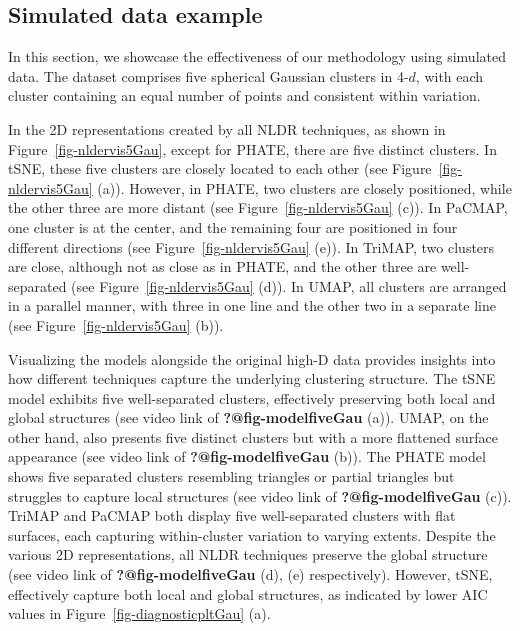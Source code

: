 \documentclass[
  12pt]{article}
\begin{document}
\hypertarget{sec-simpleex}{%
\subsection{Simulated data example}\label{sec-simpleex}}

In this section, we showcase the effectiveness of our methodology using
simulated data. The dataset comprises five spherical Gaussian clusters
in 4-\(d\), with each cluster containing an equal number of points and
consistent within variation.

In the 2D representations created by all NLDR techniques, as shown in
Figure~\ref{fig-nldervis5Gau}, except for PHATE, there are five distinct
clusters. In tSNE, these five clusters are closely located to each other
(see Figure~\ref{fig-nldervis5Gau} (a)). However, in PHATE, two clusters
are closely positioned, while the other three are more distant (see
Figure~\ref{fig-nldervis5Gau} (c)). In PaCMAP, one cluster is at the
center, and the remaining four are positioned in four different
directions (see Figure~\ref{fig-nldervis5Gau} (e)). In TriMAP, two
clusters are close, although not as close as in PHATE, and the other
three are well-separated (see Figure~\ref{fig-nldervis5Gau} (d)). In
UMAP, all clusters are arranged in a parallel manner, with three in one
line and the other two in a separate line (see
Figure~\ref{fig-nldervis5Gau} (b)).

Visualizing the models alongside the original high-D data provides
insights into how different techniques capture the underlying clustering
structure. The tSNE model exhibits five well-separated clusters,
effectively preserving both local and global structures (see video link
of \textbf{?@fig-modelfiveGau} (a)). UMAP, on the other hand, also
presents five distinct clusters but with a more flattened surface
appearance (see video link of \textbf{?@fig-modelfiveGau} (b)). The
PHATE model shows five separated clusters resembling triangles or
partial triangles but struggles to capture local structures (see video
link of \textbf{?@fig-modelfiveGau} (c)). TriMAP and PaCMAP both display
five well-separated clusters with flat surfaces, each capturing
within-cluster variation to varying extents. Despite the various 2D
representations, all NLDR techniques preserve the global structure (see
video link of \textbf{?@fig-modelfiveGau} (d), (e) respectively).
However, tSNE, effectively capture both local and global structures, as
indicated by lower AIC values in Figure~\ref{fig-diagnosticpltGau} (a).
\end{document}
